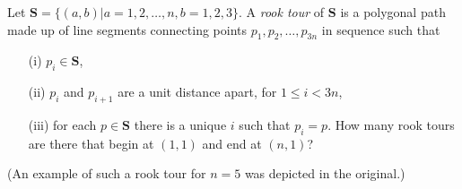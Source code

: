 Let $\mathbf{S} = \{(a,b) | a = 1, 2, \dots,n, b = 1,2,3\}$.
A \emph{rook tour} of $\mathbf{S}$ is a polygonal path made up of line
segments connecting points $p_1, p_2, \dots, p_{3n}$ in sequence such that
\begin{enumerate}
\item[(i)] $p_i \in \mathbf{S}$,
\item[(ii)] $p_i$ and $p_{i+1}$ are a unit distance apart, for
$1 \leq i <3n$,
\item[(iii)] for each $p \in \mathbf{S}$ there is a unique $i$ such that
$p_i = p$. How many rook tours are there that begin at $(1,1)$
and end at $(n,1)$?
\end{enumerate}
(An example of such a rook tour for $n=5$ was depicted in the original.)
